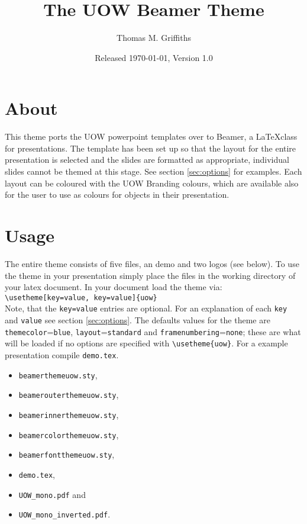 \documentclass[a4paper,oneside,12pt]{article}
\title{\textsf{The UOW Beamer Theme}}
\author{Thomas M. Griffiths}
\date{Released \today, Version 1.0}
\newcommand{\key}[1]{\texttt{\color{UOWorange}#1}}
\newcommand{\val}[1]{\texttt{\color{UOWblue}#1}}
\newcommand{\command}[1]{\texttt{\color{UOWdarkgreen}#1}}
\begin{document}
\maketitle

\section{About}
This theme ports the UOW powerpoint templates over to Beamer, a \LaTeX class for presentations. The template has been set up so that the layout for the entire presentation is selected and the slides are formatted as appropriate, individual slides cannot be themed at this stage. See section \ref{sec:options} for examples. Each layout can be coloured with the UOW Branding colours, which are available also for the user to use as colours for objects in their presentation.

\section{Usage}
The entire theme consists of five files, an demo and two logos (see below). To use the theme in your presentation simply place the files in the working directory of your latex document. In your document load the theme via:\\

\command{\textbackslash{}usetheme[\key{key}=\val{value}, \key{key}=\val{value}]\{uow\}}\\

\noindent Note, that the \command{\key{key}=\val{value}} entries are optional. For an explanation of each \key{key} and \val{value} see section \ref{sec:options}. The defaults values for the theme are \key{themecolor}=\val{blue}, \key{layout}=\val{standard} and \key{framenumbering}=\val{none}; these are what will be loaded if no options are specified with \command{\textbackslash{}usetheme\{uow\}}. For a example presentation compile \texttt{demo.tex}.
\begin{multicols}{2}
\begin{itemize}
   \item \texttt{\colorbox{UOWgrey!20}{beamerthemeuow.sty}},
   \item \texttt{\colorbox{UOWgrey!20}{beamerouterthemeuow.sty}},
   \item \texttt{\colorbox{UOWgrey!20}{beamerinnerthemeuow.sty}},
   \item \texttt{\colorbox{UOWgrey!20}{beamercolorthemeuow.sty}},
   \item \texttt{\colorbox{UOWgrey!20}{beamerfontthemeuow.sty}},
   \item \texttt{\colorbox{UOWgrey!20}{demo.tex}},
   \item \texttt{\colorbox{UOWgrey!20}{UOW\_mono.pdf}} and
   \item \texttt{\colorbox{UOWgrey!20}{UOW\_mono\_inverted.pdf}}.
\end{itemize}
\end{multicols}
\end{document}
